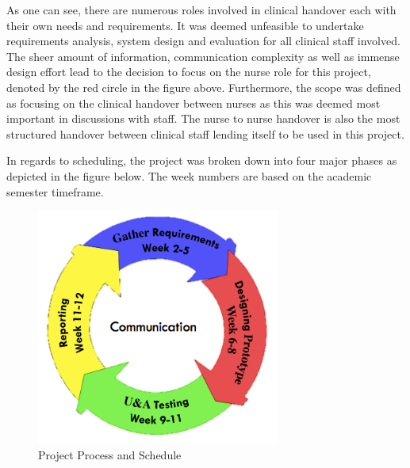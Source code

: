As one can see, there are numerous roles involved in clinical handover each with their own needs and requirements. It was deemed unfeasible to undertake requirements analysis, system design and evaluation for all clinical staff involved. The sheer amount of information, communication complexity as well as immense design effort lead to the decision to focus on the nurse role for this project, denoted by the red circle in the figure above. Furthermore, the scope was defined as focusing on the clinical handover between nurses as this was deemed most important in discussions with staff. The nurse to nurse handover is also the most structured handover between clinical staff lending itself to be used in this project. 

\newpage 
In regards to scheduling, the project was broken down into four major phases as depicted in the figure below. The week numbers are based on the academic semester timeframe.

\begin{figure}[hp]
				\centering
				\includegraphics[scale=1.0, width=80mm]{Images/Project_Process}
				\caption{Project Process and Schedule}
\end{figure} 

